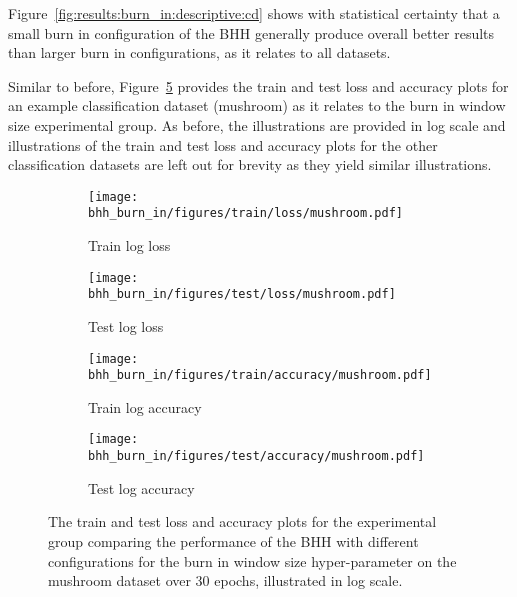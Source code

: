Figure~\ref{fig:results:burn_in:descriptive:cd} shows with statistical certainty that a small burn in configuration of the \acs{BHH} generally produce overall better results than larger burn in configurations, as it relates to all datasets.

Similar to before, Figure~\ref{fig:results:burn_in:figures:mushroom} provides the train and test loss and accuracy plots for an example classification dataset (mushroom) as it relates to the burn in window size experimental group. As before, the illustrations are provided in log scale and illustrations of the train and test loss and accuracy plots for the other classification datasets are left out for brevity as they yield similar illustrations.

\begin{figure}[htbp]
      \begin{subfigure}{0.5\textwidth}
            \centering
            \texttt{[image: bhh\_burn\_in/figures/train/loss/mushroom.pdf]}
            \caption{Train log loss}
            \label{fig:results:burn_in:figures:loss:train:mushroom}
      \end{subfigure}
      \begin{subfigure}{0.5\textwidth}
            \centering
            \texttt{[image: bhh\_burn\_in/figures/test/loss/mushroom.pdf]}
            \caption{Test log loss}
            \label{fig:results:burn_in:figures:loss:test:mushroom}
      \end{subfigure}
      \par\bigskip
      \begin{subfigure}{0.5\textwidth}
            \centering
            \texttt{[image: bhh\_burn\_in/figures/train/accuracy/mushroom.pdf]}
            \caption{Train log accuracy}
            \label{fig:results:burn_in:figures:accuracy:train:mushroom}
      \end{subfigure}
      \begin{subfigure}{0.5\textwidth}
            \centering
            \texttt{[image: bhh\_burn\_in/figures/test/accuracy/mushroom.pdf]}
            \caption{Test log accuracy}
            \label{fig:results:burn_in:figures:accuracy:test:mushroom}
      \end{subfigure}
      \par\bigskip
      \caption{The train and test loss and accuracy plots for the experimental group comparing the performance of the \acs{BHH} with different configurations for the burn in window size hyper-parameter on the mushroom dataset over 30 epochs, illustrated in log scale.}
      \label{fig:results:burn_in:figures:mushroom}
\end{figure}

